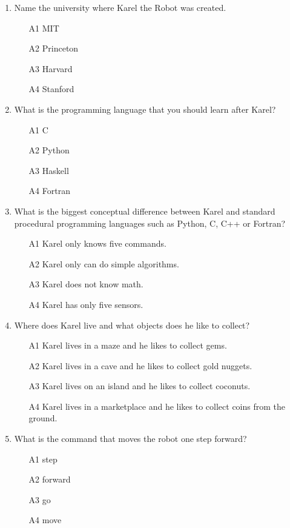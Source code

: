 \begin{enumerate}
\item Name the university where Karel the Robot was created.
\begin{enumerate}
\item[A1] MIT
\item[A2] Princeton
\item[A3] Harvard
\item[A4] Stanford
\end{enumerate}
\item What is the programming language that you should learn after Karel?
\begin{enumerate}
\item[A1] C
\item[A2] Python
\item[A3] Haskell
\item[A4] Fortran
\end{enumerate}
\item What is the biggest conceptual difference between Karel and standard
      procedural programming languages such as Python, C, C++ or Fortran?
\begin{enumerate}
\item[A1] Karel only knows five commands.
\item[A2] Karel only can do simple algorithms.
\item[A3] Karel does not know math.
\item[A4] Karel has only five sensors.
\end{enumerate}
\item Where does Karel live and what objects does he like to collect?
\begin{enumerate}
\item[A1] Karel lives in a maze and he likes to collect gems.
\item[A2] Karel lives in a cave and he likes to collect gold nuggets.
\item[A3] Karel lives on an island and he likes to collect coconuts.
\item[A4] Karel lives in a marketplace and he likes to collect coins from the ground.
\end{enumerate}
\item What is the command that moves the robot one step forward?
\begin{enumerate}
\item[A1] step
\item[A2] forward
\item[A3] go
\item[A4] move

\end{enumerate}
\end{enumerate}
